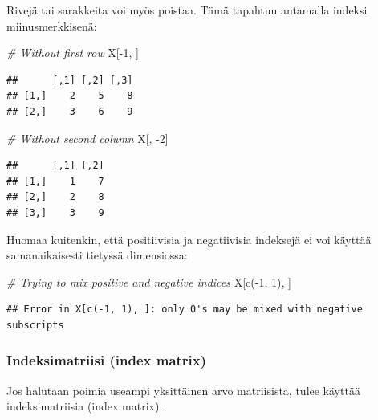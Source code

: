 \documentclass[
]{book}
\newenvironment{Shaded}{\begin{snugshade}}{\end{snugshade}}
\newcommand{\CommentTok}[1]{\textcolor[rgb]{0.56,0.35,0.01}{\textit{#1}}}
\newcommand{\DecValTok}[1]{\textcolor[rgb]{0.00,0.00,0.81}{#1}}
\newcommand{\FunctionTok}[1]{\textcolor[rgb]{0.00,0.00,0.00}{#1}}
\newcommand{\NormalTok}[1]{#1}
\newcommand{\SpecialCharTok}[1]{\textcolor[rgb]{0.00,0.00,0.00}{#1}}
\begin{document}
Rivejä tai sarakkeita voi myös poistaa. Tämä tapahtuu antamalla indeksi miinusmerkkisenä:

\begin{Shaded}
\begin{Highlighting}[]
\CommentTok{\# Without first row}
\NormalTok{X[}\SpecialCharTok{{-}}\DecValTok{1}\NormalTok{, ]}
\end{Highlighting}
\end{Shaded}

\begin{verbatim}
##      [,1] [,2] [,3]
## [1,]    2    5    8
## [2,]    3    6    9
\end{verbatim}

\begin{Shaded}
\begin{Highlighting}[]
\CommentTok{\# Without second column}
\NormalTok{X[, }\SpecialCharTok{{-}}\DecValTok{2}\NormalTok{]}
\end{Highlighting}
\end{Shaded}

\begin{verbatim}
##      [,1] [,2]
## [1,]    1    7
## [2,]    2    8
## [3,]    3    9
\end{verbatim}

Huomaa kuitenkin, että positiivisia ja negatiivisia indeksejä ei voi käyttää samanaikaisesti tietyssä dimensiossa:

\begin{Shaded}
\begin{Highlighting}[]
\CommentTok{\# Trying to mix positive and negative indices}
\NormalTok{X[}\FunctionTok{c}\NormalTok{(}\SpecialCharTok{{-}}\DecValTok{1}\NormalTok{, }\DecValTok{1}\NormalTok{), ]}
\end{Highlighting}
\end{Shaded}

\begin{verbatim}
## Error in X[c(-1, 1), ]: only 0's may be mixed with negative subscripts
\end{verbatim}

\hypertarget{indeksimatriisi-index-matrix}{%
\subsubsection{Indeksimatriisi (index matrix)}\label{indeksimatriisi-index-matrix}}

Jos halutaan poimia useampi yksittäinen arvo matriisista, tulee käyttää indeksimatriisia (index matrix).
\end{document}
